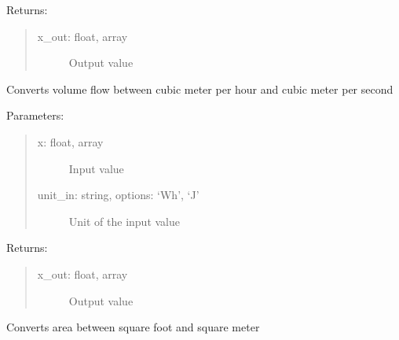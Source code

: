 \documentclass[letterpaper,10pt,english,openany]{sphinxmanual}
\begin{document}
\begin{fulllineitems}
\begin{fulllineitems}
Returns:
\begin{quote}
\begin{description}
\item[{x\_out: float, array}] \leavevmode
Output value

\end{description}
\end{quote}

\end{fulllineitems}


\begin{fulllineitems}
\label{\detokenize{source/mswh.tools:mswh.tools.unit_converters.UnitConv.m3perh_m3pers}}
Converts volume flow between cubic meter
per hour and cubic meter per second

Parameters:
\begin{quote}
\begin{description}
\item[{x: float, array}] \leavevmode
Input value

\item[{unit\_in: string, options: ‘Wh’, ‘J’}] \leavevmode
Unit of the input value

\end{description}
\end{quote}

Returns:
\begin{quote}
\begin{description}
\item[{x\_out: float, array}] \leavevmode
Output value

\end{description}
\end{quote}

\end{fulllineitems}


\begin{fulllineitems}
\label{\detokenize{source/mswh.tools:mswh.tools.unit_converters.UnitConv.sqft_m2}}
Converts area between square foot
and square meter


\end{fulllineitems}
\end{fulllineitems}
\end{document}
